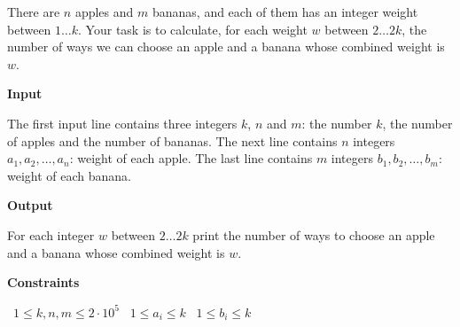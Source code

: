 There are $n$ apples and $m$ bananas, and each of them has an integer weight between $1 \ldots k$. Your task is to calculate, for each weight $w$ between $2 \dots 2k$, the number of ways we can choose an apple and a banana whose combined weight is $w$.

\vspace{0.3cm}\noindent\textbf{Input}

The first input line contains three integers $k$, $n$ and $m$: the number $k$, the number of apples and the number of bananas.
The next line contains $n$ integers $a_1,a_2,\ldots,a_n$: weight of each apple.
The last line contains $m$ integers $b_1,b_2,\ldots,b_m$: weight of each banana.

\vspace{0.3cm}\noindent\textbf{Output}

For each integer $w$ between $2 \ldots 2k$ print the number of ways to choose an apple and a banana whose combined weight is $w$.

\vspace{0.3cm}\noindent\textbf{Constraints}

\textbullet\ $1 \le k,n,m \le 2 \cdot 10^5$
\textbullet\ $1 \le a_i \le k$
\textbullet\ $1 \le b_i \le k$